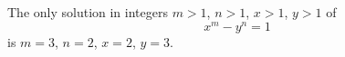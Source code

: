 \begin{proposition}\label{eq:191}
    The only solution in integers $m>1$, $n>1$, $x>1$, $y>1$ of
\[
    x^m-y^n=1
\]
    is $m=3$, $n=2$, $x=2$, $y=3$.
\end{proposition}
